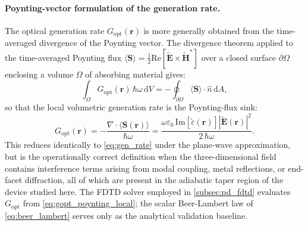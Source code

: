 \paragraph{Poynting-vector formulation of the generation rate.}
The optical generation rate $G_{\mathrm{opt}}(\mathbf{r})$ is more generally
obtained from the time-averaged divergence of the Poynting vector. The divergence
theorem applied to the time-averaged Poynting flux
$\langle\mathbf{S}\rangle = \tfrac{1}{2}\mathrm{Re}[\tilde{\mathbf{E}}\times\tilde{\mathbf{H}}^{*}]$
over a closed surface $\partial\Omega$ enclosing a volume $\Omega$ of absorbing
material gives:
\begin{equation}
    \int_\Omega G_{\mathrm{opt}}(\mathbf{r})\,\hbar\omega\,\mathrm{d}V
    = -\oint_{\partial\Omega}
      \langle\mathbf{S}\rangle\cdot\hat{n}\,\mathrm{d}A,
    \label{eq:gopt_poynting}
\end{equation}
so that the local volumetric generation rate is the Poynting-flux sink:
\begin{equation}
    G_{\mathrm{opt}}(\mathbf{r})
    = -\frac{\nabla\cdot\langle\mathbf{S}(\mathbf{r})\rangle}{\hbar\omega}
    = \frac{\omega\varepsilon_0\,\mathrm{Im}[\tilde{\varepsilon}(\mathbf{r})]
           |\tilde{\mathbf{E}}(\mathbf{r})|^2}{2\,\hbar\omega}.
    \label{eq:gopt_poynting_local}
\end{equation}
This reduces identically to \cref{eq:gen_rate} under the plane-wave
approximation, but is the operationally correct definition when the
three-dimensional field contains interference terms arising from modal coupling,
metal reflections, or end-facet diffraction, all of which are present in the
adiabatic taper region of the device studied here.
The FDTD solver employed in \cref{subsec:pd_fdtd} evaluates
$G_{\mathrm{opt}}$ from \cref{eq:gopt_poynting_local}; the scalar Beer-Lambert
law of \cref{eq:beer_lambert} serves only as the analytical validation baseline.

